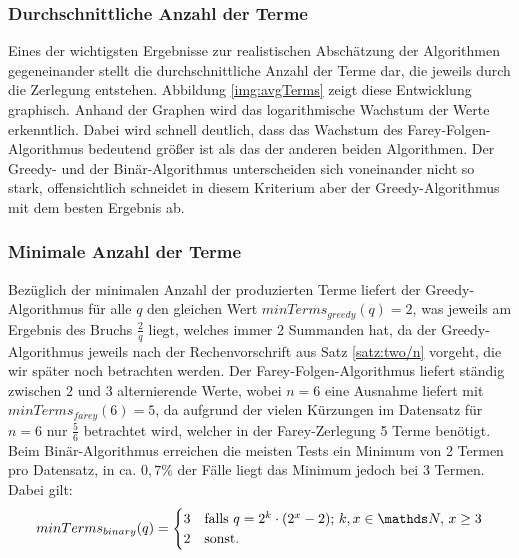 \subsubsection{Durchschnittliche Anzahl der Terme}
Eines der wichtigsten Ergebnisse zur realistischen Abschätzung der Algorithmen gegeneinander stellt die durchschnittliche Anzahl der Terme dar, die jeweils durch die Zerlegung entstehen. Abbildung \ref{img:avgTerms} zeigt diese Entwicklung graphisch.
Anhand der Graphen wird das logarithmische Wachstum der Werte erkenntlich. Dabei wird schnell deutlich, dass das Wachstum des Farey-Folgen-Algorithmus bedeutend größer ist als das der anderen beiden Algorithmen. Der Greedy- und der Binär-Algorithmus unterscheiden sich voneinander nicht so stark, offensichtlich schneidet in diesem Kriterium aber der Greedy-Algorithmus mit dem besten Ergebnis ab.

\subsubsection{Minimale Anzahl der Terme}
Bezüglich der minimalen Anzahl der produzierten Terme liefert der Greedy-Algorithmus für alle $q$ den gleichen Wert $minTerms_{greedy}(q) = 2$, was jeweils am Ergebnis des Bruchs $\frac{2}{q}$ liegt, welches immer 2 Summanden hat, da der Greedy-Algorithmus jeweils nach der Rechenvorschrift aus Satz \ref{satz:two/n} vorgeht, die wir später noch betrachten werden. Der Farey-Folgen-Algorithmus liefert ständig zwischen $2$ und $3$ alternierende Werte, wobei $n=6$ eine Ausnahme liefert mit $minTerms_{farey}(6) = 5$, da aufgrund der vielen Kürzungen im Datensatz für $n=6$ nur $\frac{5}{6}$ betrachtet wird, welcher in der Farey-Zerlegung 5 Terme benötigt. Beim Binär-Algorithmus erreichen die meisten Tests ein Minimum von 2 Termen pro Datensatz, in ca. $0,7\%$ der Fälle liegt das Minimum jedoch bei 3 Termen. Dabei gilt:
$$minTerms_{binary}(q) = \begin{cases} 3 & \text{falls } q = 2^k \cdot (2^x-2);\, k, x \in \N, \, x \geq3\\ 2 & \text{sonst.} \end{cases}$$

